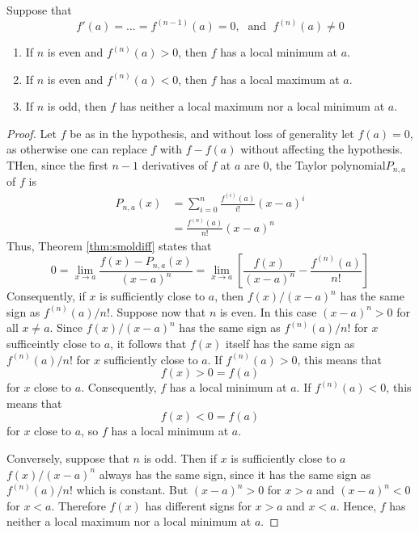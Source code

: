 \begin{thm}
    Suppose that \begin{equation*}
        f'(a) = ... = f^{(n-1)}(a) = 0,\;\text{ and }\;f^{(n)}(a) \neq 0
    \end{equation*}
    \begin{enumerate}
        \item If $n$ is even and $f^{(n)}(a) > 0$, then $f$ has a local minimum at $a$.
        \item If $n$ is even and $f^{(n)}(a) < 0$, then $f$ has a local maximum at $a$.
        \item If $n$ is odd, then $f$ has neither a local maximum nor a local minimum at $a$.
    \end{enumerate}
\end{thm}
\begin{proof}
    Let $f$ be as in the hypothesis, and without loss of generality let $f(a) = 0$, as otherwise one can replace $f$ with $f-f(a)$ without affecting the hypothesis. THen, since the first $n-1$ derivatives of $f$ at $a$ are $0$, the Taylor polynomial$ P_{n,a}$ of $f$ is \begin{align*}
        P_{n,a}(x) &= \sum\limits_{i=0}^n\frac{f^{(i)}(a)}{i!}(x-a)^i \\
        &= \frac{f^{(n)}(a)}{n!}(x-a)^n 
    \end{align*}
    Thus, Theorem \ref{thm:smoldiff} states that \begin{equation*}
        0 = \lim\limits_{x\rightarrow a} \frac{f(x) - P_{n,a}(x)}{(x-a)^n} = \lim\limits_{x\rightarrow a} \left[\frac{f(x)}{(x-a)^n} - \frac{f^{(n)}(a)}{n!}\right]
    \end{equation*}
    Consequently, if $x$ is sufficiently close to $a$, then $f(x)/(x-a)^n$ has the same sign as $f^{(n)}(a)/n!$. Suppose now that $n$ is even. In this case $(x-a)^n > 0$ for all $x \neq a$. Since $f(x)/(x-a)^n$ has the same sign as $f^{(n)}(a)/n!$ for $x$ sufficeintly close to $a$, it follows that $f(x)$ itself has the same sign as $f^{(n)}(a)/n!$ for $x$ sufficiently close to $a$. If $f^{(n)}(a) > 0$, this means that \begin{equation*}
        f(x) > 0 = f(a)
    \end{equation*}
    for $x$ close to $a$. Consequently, $f$ has a local minimum at $a$. If $f^{(n)}(a) < 0$, this means that \begin{equation*}
        f(x) < 0 = f(a)
    \end{equation*}
    for $x$ close to $a$, so $f$ has a local minimum at $a$.

    Conversely, suppose that $n$ is odd. Then if $x$ is sufficiently close to $a$ $f(x)/(x-a)^n$ always has the same sign, since it has the same sign as $f^{(n)}(a)/n!$ which is constant. But $(x-a)^n >0$ for $x >a$ and $(x-a)^n < 0$ for $x < a$. Therefore $f(x)$ has different signs for $x > a$ and $x <a$. Hence, $f$ has neither a local maximum nor a local minimum at $a$.
\end{proof}

